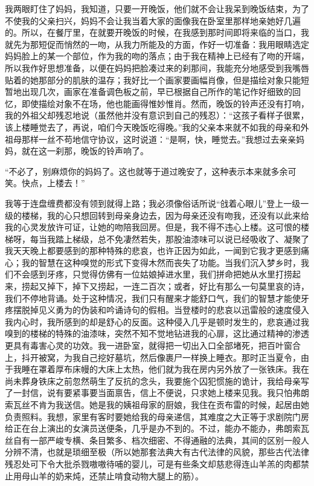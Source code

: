 \par 我两眼盯住了妈妈，我知道，只要一开晚饭，他们就不会让我呆到晚饭结束，为了不使我的父亲扫兴，妈妈不会让我当着大家的面像我在卧室里那样地亲她好几遍的。所以，在餐厅里，在就要开晚饭的时候，在我感到那时间即将来临的当口，我就先为那短促而悄然的一吻，从我力所能及的方面，作好一切准备：我用眼睛选定妈妈脸上的某一个部位，作为我的吻的落点；由于我在精神上已经有了吻的开端，所以我作好思想准备，以便在妈妈把脸凑过来的刹那间，我能充分地感受到我嘴唇贴着的她那部分的肌肤的温存；我好比一个画家要画幅肖像，但是描绘对象只能短暂地出现几次，画家在准备调色板之前，早已根据自己所作的笔记作好细致的回忆，即使描绘对象不在场，他也能画得惟妙惟肖。然而，晚饭的铃声还没有打响，我的外祖父却残忍地说（虽然他并没有意识到自己的残忍）：“这孩子看样子很累，该上楼睡觉去了，再说，咱们今天晚饭吃得晚。”我的父亲本来就不如我的母亲和外祖母那样一丝不苟地信守协议，这时说道：“是啊，快，睡觉去。”我想过去亲亲妈妈，就在这一刹那，晚饭的铃声响了。
\par “不必了，别麻烦你的妈妈了。这也就等于道过晚安了，这种表示本来就多余可笑。快点，上楼去！”
\par 我等于连盘缠费都没有领到就得上路；我必须像俗话所说“戗着心眼儿”登上一级一级的楼梯，我的心只想回转到母亲身边去，因为母亲还没有吻我，还没有以此来给我的心灵发放许可证，让她的吻陪我回房。但是，我不得不违心上楼。这可恨的楼梯呀，每当我踏上梯级，总不免凄然若失，那股油漆味可以说已经吸收了、凝聚了我天天晚上都要感到的那种特殊的悲哀，也许正因为如此，一闻到它我才更感到痛心；我的智慧在这种嗅觉的形式下变得木然而丧失了功能。当我们沉入梦乡时，我们不会感到牙疼，只觉得仿佛有一位姑娘掉进水里，我们拼命把她从水里打捞起来，捞起又掉下，掉下又捞起，一连二百次；或者，好比有那么一句莫里哀的诗，我们不停地背诵。处于这种情况，我们只有醒来才能舒口气，我们的智慧才能使牙疼摆脱掉见义勇为的伪装和吟诵诗句的假相。当登楼时的悲哀以迅雷般的速度侵入我内心时，我所感到的却是舒心的反面。这种侵入几乎是顿时发生的，悲哀通过我嗅到的楼梯的特殊的油漆味，突然不知不觉地钻进我的心扉，这比通过精神的渗透更具有毒害心灵的功效。我一进卧室，就得把一切出入口全部堵死，把百叶窗合上，抖开被窝，为我自己挖好墓坑，然后像裹尸一样换上睡衣。那时正当夏令，由于我睡在罩着厚布床幔的大床上太热，他们就为我在房内另外放了一张铁床。我在尚未葬身铁床之前忽然萌生了反抗的念头，我要施个囚犯惯施的诡计，我给母亲写了一封信，说有要紧事要当面禀告，信上不便说，只求她上楼来见我。我只怕弗朗索瓦丝不肯为我送信。她是我的姨祖母家的厨娘，我住在贡布雷的时候，起居由她负责照料。我想，家里有客时要她给我的母亲递信，其难度之大正等于求剧院门房给正在台上演出的女演员送便条，几乎是办不到的。不过，能办不能办，弗朗索瓦丝自有一部严峻专横、条目繁多、档次细密、不得通融的法典，其间的区别一般人分辨不清，也就是琐细至极（所以她那套法典大有古代法律的风貌，那些古代法律残忍处可下令大批杀戮嗷嗷待哺的婴儿，可是有些条文却慈悲得连山羊羔的肉都禁止用母山羊的奶来炖，还禁止啃食动物大腿上的筋）。
